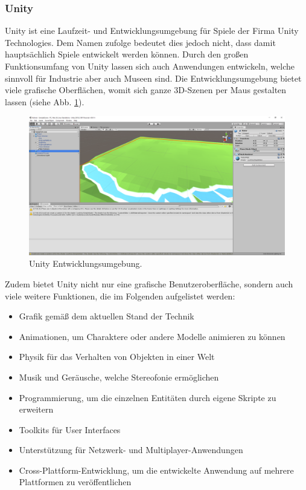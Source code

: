 \documentclass[a4paper,12pt,oneside]{article}
\begin{document}
      \subsubsection{Unity}
        Unity ist eine Laufzeit- und Entwicklungsumgebung für Spiele der Firma Unity
        Technologies. Dem Namen zufolge bedeutet dies jedoch nicht, dass damit 
        hauptsächlich Spiele entwickelt werden können. 
        Durch den großen Funktionsumfang von Unity lassen sich auch
        Anwendungen entwickeln, welche sinnvoll für Industrie aber auch Museen sind.
        Die Entwicklungsumgebung bietet viele grafische Oberflächen, womit sich ganze
        3D-Szenen per Maus gestalten lassen (siehe Abb. \ref{fig:unity1}). 
        \begin{figure}[t]
          \centering
          \includegraphics[scale=0.3]{img/unity1.png}
          \caption{Unity Entwicklungsumgebung.}
          \label{fig:unity1}
        \end{figure}
        Zudem bietet Unity nicht nur eine grafische Benutzeroberfläche, 
        sondern auch viele weitere Funktionen, die im Folgenden aufgelistet werden:
        \begin{itemize}
          \item Grafik gemäß dem aktuellen Stand der Technik
          \item Animationen, um Charaktere oder andere Modelle animieren zu können
          \item Physik für das Verhalten von Objekten in einer Welt
          \item Musik und Geräusche, welche Stereofonie ermöglichen
          \item Programmierung, um die einzelnen Entitäten durch eigene Skripte
          zu erweitern
          \item Toolkits für User Interfaces
          \item Unterstützung für Netzwerk- und Multiplayer-Anwendungen
          \item Cross-Plattform-Entwicklung, um die entwickelte Anwendung auf mehrere
          Plattformen zu veröffentlichen
        \end{itemize}
\end{document}
